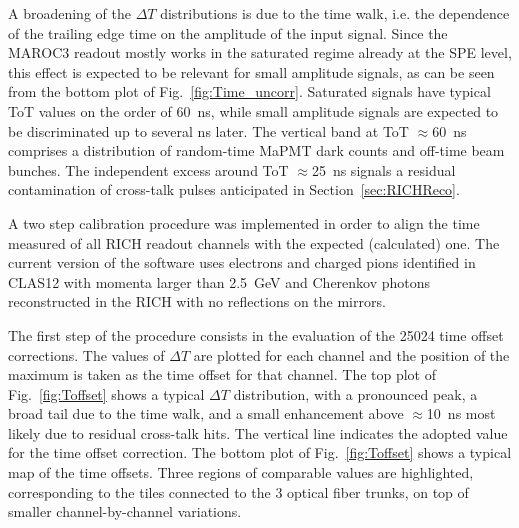 \documentclass[5p,times,twocolumn]{elsarticle}
\def\MaPMT{MaPMT }
\begin{document}
A broadening of the $\Delta T$ distributions is due to the time walk, i.e. the dependence of the trailing edge time
on the amplitude of the input signal. Since the MAROC3 readout mostly works in the saturated regime already
at the SPE level, this effect is expected to be relevant for small amplitude signals, as can be seen from the bottom
plot of Fig.~\ref{fig:Time_uncorr}. Saturated signals have typical ToT values on the order of 60~ns, while small
amplitude signals are expected to be discriminated up to several ns later. The vertical band at ToT $\approx$60~ns
comprises a distribution of random-time \MaPMT dark counts and off-time beam bunches. The independent excess
around ToT $\approx$25~ns signals a residual contamination of cross-talk pulses anticipated in Section~\ref{sec:RICHReco}.



A two step calibration procedure was implemented in order to align the time measured of all RICH readout
channels with the expected (calculated) one. The current version of the software uses electrons and charged pions
identified in CLAS12 with momenta larger than 2.5~GeV and Cherenkov photons reconstructed in the RICH with
no reflections on the mirrors.

The first step of the procedure consists in the evaluation of the 25024 time offset corrections. The values of
$\Delta T$ are plotted for each channel and the position of the maximum is taken as the time offset for that
channel. The top plot of Fig.~\ref{fig:Toffset} shows a typical $\Delta T$ distribution, with a pronounced peak, a
broad tail due to the time walk, and a small enhancement above $\approx$10~ns most likely due to residual cross-talk
hits. The vertical line indicates the adopted value for the time offset correction. The bottom plot of
Fig.~\ref{fig:Toffset} shows a typical map of the time offsets. Three regions of comparable values are highlighted,
corresponding to the tiles connected to the 3 optical fiber trunks, on top of smaller channel-by-channel variations.
\end{document}
